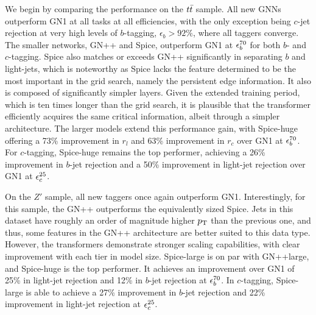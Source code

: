 We begin by comparing the performance on the $t\bar{t}$ sample.
All new GNNs outperform GN1 at all tasks at all efficiencies, with the only exception being $c$-jet rejection at very high levels of $b$-tagging, $\epsilon_b > 92\%$, where all taggers converge.
The smaller networks, GN++ and Spice, outperform GN1 at $\epsilon_b^{70}$ for both $b$- and $c$-tagging.
Spice also matches or exceeds GN++ significantly in separating $b$ and light-jets, which is noteworthy as Spice lacks the feature determined to be the most important in the grid search, namely the persistent edge information.
It also is composed of significantly simpler layers.
Given the extended training period, which is ten times longer than the grid search, it is plausible that the transformer efficiently acquires the same critical information, albeit through a simpler architecture.
The larger models extend this performance gain, with Spice-huge offering a 73\% improvement in $r_l$ and 63\% improvement in $r_c$ over GN1 at $\epsilon_b^{70}$.
For $c$-tagging, Spice-huge remains the top performer, achieving a 26\% improvement in $b$-jet rejection and a 50\% improvement in light-jet rejection over GN1 at $\epsilon_c^{25}$.

On the $Z'$ sample, all new taggers once again outperform GN1.
Interestingly, for this sample, the GN++ outperforms the equivalently sized Spice.
Jets in this dataset have roughly an order of magnitude higher $p_{\text{T}}$ than the previous one, and thus, some features in the GN++ architecture are better suited to this data type.
However, the transformers demonstrate stronger scaling capabilities, with clear improvement with each tier in model size.
Spice-large is on par with GN++large, and Spice-huge is the top performer.
It achieves an improvement over GN1 of 25\% in light-jet rejection and 12\% in $b$-jet rejection at $\epsilon_b^{70}$.
In $c$-tagging, Spice-large is able to achieve a 27\% improvement in $b$-jet rejection and 22\% improvement in light-jet rejection at $\epsilon_c^{25}$.

